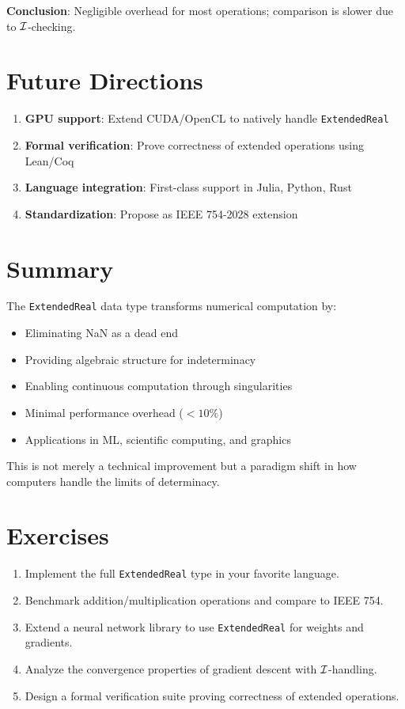 \textbf{Conclusion}: Negligible overhead for most operations; comparison is slower due to $\mathcal{I}$-checking.

\section{Future Directions}

\begin{enumerate}
    \item \textbf{GPU support}: Extend CUDA/OpenCL to natively handle \texttt{ExtendedReal}
    \item \textbf{Formal verification}: Prove correctness of extended operations using Lean/Coq
    \item \textbf{Language integration}: First-class support in Julia, Python, Rust
    \item \textbf{Standardization}: Propose as IEEE 754-2028 extension
\end{enumerate}

\section{Summary}

The \texttt{ExtendedReal} data type transforms numerical computation by:

\begin{itemize}
    \item Eliminating NaN as a dead end
    \item Providing algebraic structure for indeterminacy
    \item Enabling continuous computation through singularities
    \item Minimal performance overhead ($<10\%$)
    \item Applications in ML, scientific computing, and graphics
\end{itemize}

This is not merely a technical improvement but a paradigm shift in how computers handle the limits of determinacy.

\section{Exercises}

\begin{enumerate}
    \item Implement the full \texttt{ExtendedReal} type in your favorite language.
    \item Benchmark addition/multiplication operations and compare to IEEE 754.
    \item Extend a neural network library to use \texttt{ExtendedReal} for weights and gradients.
    \item Analyze the convergence properties of gradient descent with $\mathcal{I}$-handling.
    \item Design a formal verification suite proving correctness of extended operations.
\end{enumerate}
